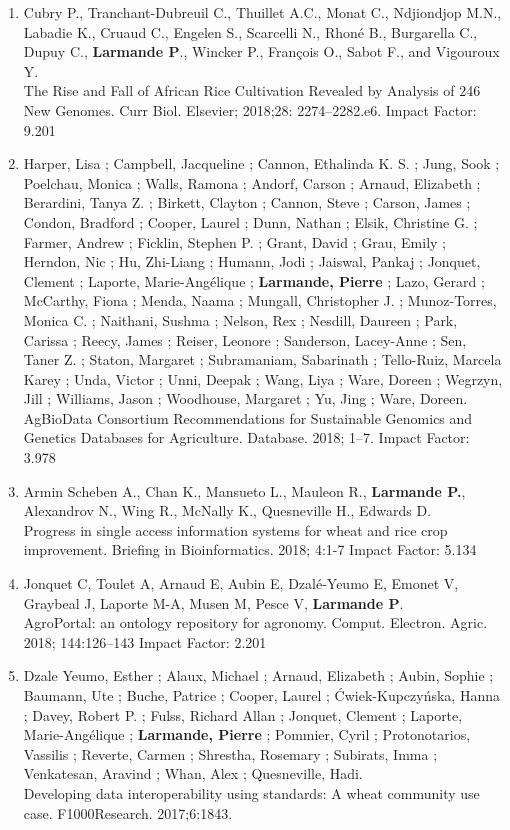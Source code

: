 \begin{enumerate}
\item	Cubry P., Tranchant-Dubreuil C., Thuillet A.C., Monat C., Ndjiondjop M.N., Labadie K., Cruaud C., Engelen S., Scarcelli N., Rhoné B., Burgarella C., Dupuy C., \textbf{Larmande P}., Wincker P., François O., Sabot F., and Vigouroux Y.\\ The Rise and Fall of African Rice Cultivation Revealed by Analysis of 246 New Genomes. Curr Biol. Elsevier; 2018;28: 2274–2282.e6. Impact Factor: 9.201
\item Harper, Lisa ; Campbell, Jacqueline ; Cannon, Ethalinda K. S. ; Jung, Sook ; Poelchau, Monica ; Walls, Ramona ; Andorf, Carson ; Arnaud, Elizabeth ; Berardini, Tanya Z. ; Birkett, Clayton ; Cannon, Steve ; Carson, James ; Condon, Bradford ; Cooper, Laurel ; Dunn, Nathan ; Elsik, Christine G. ; Farmer, Andrew ; Ficklin, Stephen P. ; Grant, David ; Grau, Emily ; Herndon, Nic ; Hu, Zhi-Liang ; Humann, Jodi ; Jaiswal, Pankaj ; Jonquet, Clement ; Laporte, Marie-Angélique ; \textbf{Larmande, Pierre} ; Lazo, Gerard ; McCarthy, Fiona ; Menda, Naama ; Mungall, Christopher J. ; Munoz-Torres, Monica C. ; Naithani, Sushma ; Nelson, Rex ; Nesdill, Daureen ; Park, Carissa ; Reecy, James ; Reiser, Leonore ; Sanderson, Lacey-Anne ; Sen, Taner Z. ; Staton, Margaret ; Subramaniam, Sabarinath ; Tello-Ruiz, Marcela Karey ; Unda, Victor ; Unni, Deepak ; Wang, Liya ; Ware, Doreen ; Wegrzyn, Jill ; Williams, Jason ; Woodhouse, Margaret ; Yu, Jing ; Ware, Doreen.\\ AgBioData Consortium Recommendations for Sustainable Genomics and Genetics Databases for Agriculture. Database. 2018; 1–7. Impact Factor: 3.978
\item Armin Scheben A., Chan K., Mansueto L., Mauleon R., \textbf{Larmande P.}, Alexandrov N., Wing R., McNally K., Quesneville H., Edwards D.\\ Progress in single access information systems for wheat and rice crop improvement. Briefing in Bioinformatics. 2018; 4:1-7 Impact Factor: 5.134
\item	Jonquet C, Toulet A, Arnaud E, Aubin E, Dzalé-Yeumo E, Emonet V, Graybeal J, Laporte M-A, Musen M, Pesce V, \textbf{Larmande P}.\\ AgroPortal: an ontology repository for agronomy. Comput. Electron. Agric. 2018; 144:126–143 Impact Factor: 2.201
\item	Dzale Yeumo, Esther ; Alaux, Michael ; Arnaud, Elizabeth ; Aubin, Sophie ; Baumann, Ute ; Buche, Patrice ; Cooper, Laurel ; Ćwiek-Kupczyńska, Hanna ; Davey, Robert P. ; Fulss, Richard Allan ; Jonquet, Clement ; Laporte, Marie-Angélique ; \textbf{Larmande, Pierre} ; Pommier, Cyril ; Protonotarios, Vassilis ; Reverte, Carmen ; Shrestha, Rosemary ; Subirats, Imma ; Venkatesan, Aravind ; Whan, Alex ; Quesneville, Hadi.\\ Developing data interoperability using standards: A wheat community use case. F1000Research. 2017;6:1843.

\end{enumerate}
